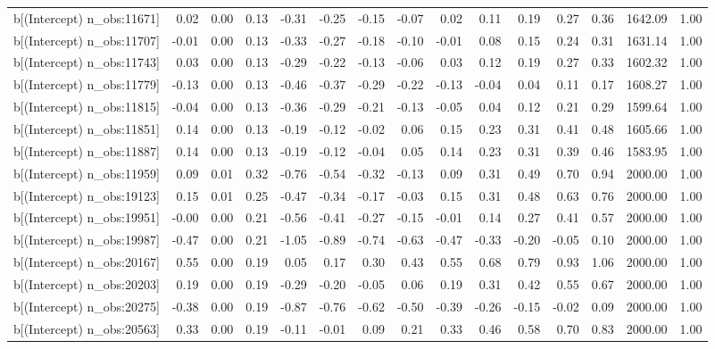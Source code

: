 \begin{table}[ht]
\begin{tabular}{rrrrrrrrrrrrrrr}
  b[(Intercept) n\_obs:11671] & 0.02 & 0.00 & 0.13 & -0.31 & -0.25 & -0.15 & -0.07 & 0.02 & 0.11 & 0.19 & 0.27 & 0.36 & 1642.09 & 1.00 \\ 
  b[(Intercept) n\_obs:11707] & -0.01 & 0.00 & 0.13 & -0.33 & -0.27 & -0.18 & -0.10 & -0.01 & 0.08 & 0.15 & 0.24 & 0.31 & 1631.14 & 1.00 \\ 
  b[(Intercept) n\_obs:11743] & 0.03 & 0.00 & 0.13 & -0.29 & -0.22 & -0.13 & -0.06 & 0.03 & 0.12 & 0.19 & 0.27 & 0.33 & 1602.32 & 1.00 \\ 
  b[(Intercept) n\_obs:11779] & -0.13 & 0.00 & 0.13 & -0.46 & -0.37 & -0.29 & -0.22 & -0.13 & -0.04 & 0.04 & 0.11 & 0.17 & 1608.27 & 1.00 \\ 
  b[(Intercept) n\_obs:11815] & -0.04 & 0.00 & 0.13 & -0.36 & -0.29 & -0.21 & -0.13 & -0.05 & 0.04 & 0.12 & 0.21 & 0.29 & 1599.64 & 1.00 \\ 
  b[(Intercept) n\_obs:11851] & 0.14 & 0.00 & 0.13 & -0.19 & -0.12 & -0.02 & 0.06 & 0.15 & 0.23 & 0.31 & 0.41 & 0.48 & 1605.66 & 1.00 \\ 
  b[(Intercept) n\_obs:11887] & 0.14 & 0.00 & 0.13 & -0.19 & -0.12 & -0.04 & 0.05 & 0.14 & 0.23 & 0.31 & 0.39 & 0.46 & 1583.95 & 1.00 \\ 
  b[(Intercept) n\_obs:11959] & 0.09 & 0.01 & 0.32 & -0.76 & -0.54 & -0.32 & -0.13 & 0.09 & 0.31 & 0.49 & 0.70 & 0.94 & 2000.00 & 1.00 \\ 
  b[(Intercept) n\_obs:19123] & 0.15 & 0.01 & 0.25 & -0.47 & -0.34 & -0.17 & -0.03 & 0.15 & 0.31 & 0.48 & 0.63 & 0.76 & 2000.00 & 1.00 \\ 
  b[(Intercept) n\_obs:19951] & -0.00 & 0.00 & 0.21 & -0.56 & -0.41 & -0.27 & -0.15 & -0.01 & 0.14 & 0.27 & 0.41 & 0.57 & 2000.00 & 1.00 \\ 
  b[(Intercept) n\_obs:19987] & -0.47 & 0.00 & 0.21 & -1.05 & -0.89 & -0.74 & -0.63 & -0.47 & -0.33 & -0.20 & -0.05 & 0.10 & 2000.00 & 1.00 \\ 
  b[(Intercept) n\_obs:20167] & 0.55 & 0.00 & 0.19 & 0.05 & 0.17 & 0.30 & 0.43 & 0.55 & 0.68 & 0.79 & 0.93 & 1.06 & 2000.00 & 1.00 \\ 
  b[(Intercept) n\_obs:20203] & 0.19 & 0.00 & 0.19 & -0.29 & -0.20 & -0.05 & 0.06 & 0.19 & 0.31 & 0.42 & 0.55 & 0.67 & 2000.00 & 1.00 \\ 
  b[(Intercept) n\_obs:20275] & -0.38 & 0.00 & 0.19 & -0.87 & -0.76 & -0.62 & -0.50 & -0.39 & -0.26 & -0.15 & -0.02 & 0.09 & 2000.00 & 1.00 \\ 
  b[(Intercept) n\_obs:20563] & 0.33 & 0.00 & 0.19 & -0.11 & -0.01 & 0.09 & 0.21 & 0.33 & 0.46 & 0.58 & 0.70 & 0.83 & 2000.00 & 1.00 \\ 

\end{tabular}
\end{table}
